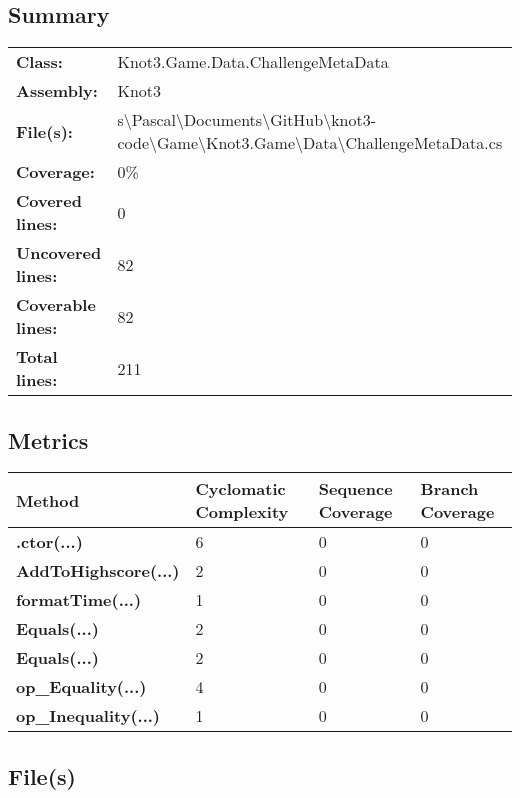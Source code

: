 \documentclass[a4paper,10pt]{article}
\begin{document}
\subsection{Summary}
\begin{longtable}[l]{ll}
\textbf{Class:} & Knot3.Game.Data.ChallengeMetaData\\
\textbf{Assembly:} & Knot3\\
\textbf{File(s):} & \begin{minipage}[t]{12cm}{s\textbackslash Pascal\textbackslash Documents\textbackslash GitHub\textbackslash knot3-code\textbackslash Game\textbackslash Knot3.Game\textbackslash Data\textbackslash ChallengeMetaData.cs}\end{minipage} \\
\textbf{Coverage:} & 0\%\\
\textbf{Covered lines:} & 0\\
\textbf{Uncovered lines:} & 82\\
\textbf{Coverable lines:} & 82\\
\textbf{Total lines:} & 211\\
\end{longtable}
\subsection{Metrics}
\begin{longtable}[l]{|l|l|l|l|}
\hline
\textbf{Method} & \textbf{Cyclomatic Complexity} & \textbf{Sequence Coverage} & \textbf{Branch Coverage}\\
\hline
\textbf{.ctor(...)} & 6 & 0 & 0\\
\hline
\textbf{AddToHighscore(...)} & 2 & 0 & 0\\
\hline
\textbf{formatTime(...)} & 1 & 0 & 0\\
\hline
\textbf{Equals(...)} & 2 & 0 & 0\\
\hline
\textbf{Equals(...)} & 2 & 0 & 0\\
\hline
\textbf{op\_Equality(...)} & 4 & 0 & 0\\
\hline
\textbf{op\_Inequality(...)} & 1 & 0 & 0\\
\hline
\end{longtable}
\subsection{File(s)}
\end{document}
